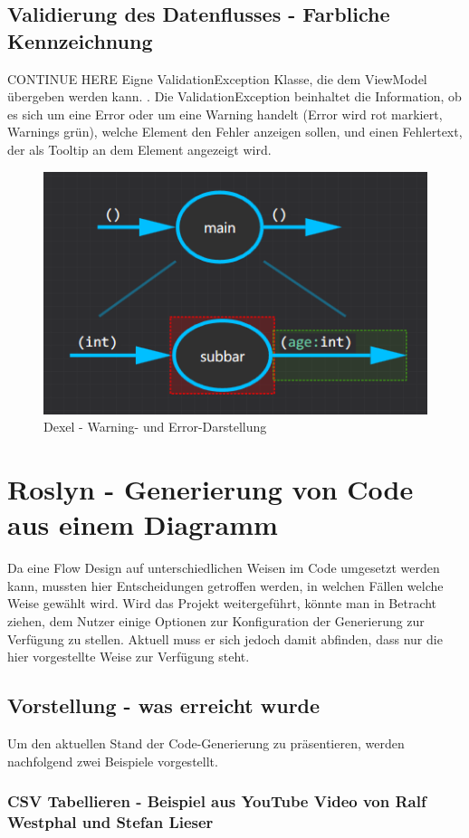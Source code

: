 \subsection{Validierung des Datenflusses - Farbliche Kennzeichnung }
CONTINUE HERE
Eigne ValidationException Klasse, die dem ViewModel übergeben werden kann. .
Die ValidationException beinhaltet die Information, ob es sich um eine Error oder um eine Warning handelt (Error wird rot markiert, Warnings grün), welche  Element den Fehler anzeigen sollen, und einen Fehlertext, der als Tooltip an dem Element angezeigt wird.

\begin{figure}[H]
	\centering
	\includegraphics[width=0.6\linewidth]{./img/DexelValidation.png}
	\caption{Dexel - Warning- und Error-Darstellung}
\end{figure}



\section{Roslyn - Generierung von Code aus einem Diagramm}

Da eine Flow Design auf unterschiedlichen Weisen im Code umgesetzt werden
kann, mussten hier Entscheidungen getroffen werden, in welchen Fällen
welche Weise gewählt wird. Wird das Projekt weitergeführt, könnte man in
Betracht ziehen, dem Nutzer einige Optionen zur Konfiguration der Generierung
zur Verfügung zu stellen. Aktuell muss er sich jedoch damit abfinden, dass nur die hier vorgestellte Weise zur Verfügung steht.


\subsection{Vorstellung - was erreicht wurde}

Um den aktuellen Stand der Code-Generierung zu präsentieren, werden nachfolgend zwei Beispiele 
vorgestellt.

\subsubsection{CSV Tabellieren -  Beispiel aus YouTube Video von Ralf Westphal und Stefan Lieser}

